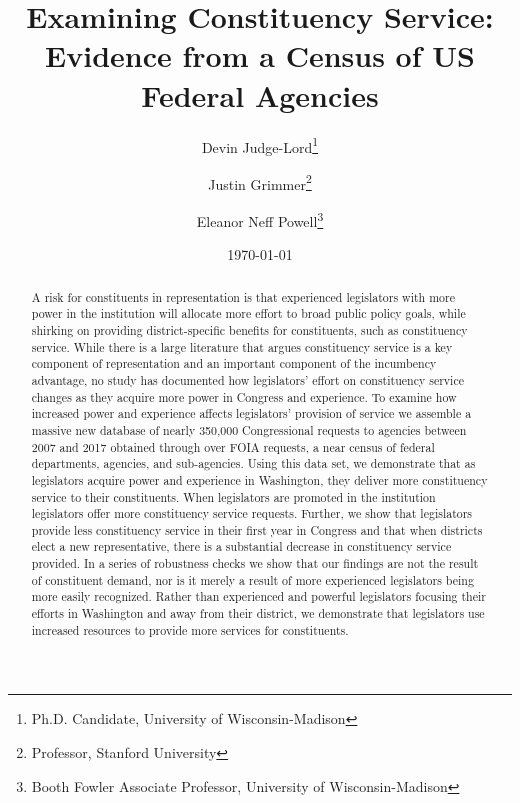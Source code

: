 \documentclass{article}
\title{Examining Constituency Service: Evidence from a Census of US Federal Agencies}
\author{Devin Judge-Lord\thanks{Ph.D. Candidate, University of Wisconsin-Madison}\and Justin Grimmer\thanks{Professor, Stanford University} \and Eleanor Neff Powell\thanks{Booth Fowler Associate Professor, University of Wisconsin-Madison}}
\date{\today}
\begin{document}
\maketitle




\begin{abstract}
\noindent A risk for constituents in representation is that experienced legislators with more power in the institution will allocate more effort to broad public policy goals, while shirking on providing district-specific benefits for constituents, such as constituency service.  While there is a large literature that argues constituency service is a key component of representation and an important component of the incumbency advantage, no study has documented how legislators' effort on constituency service changes as they acquire more power in Congress and experience.  To examine how increased power and experience affects legislators' provision of service we assemble a massive new database of nearly 350,000 Congressional requests to agencies between 2007 and 2017 obtained through over  FOIA requests, a near census of federal departments, agencies, and sub-agencies. Using this data set, we demonstrate that as legislators acquire power and experience in Washington, they deliver more constituency service to their constituents.  When legislators are promoted in the institution legislators offer more constituency service requests.  Further, we show that legislators provide less constituency service in their first year in Congress and that when districts elect a new representative, there is a substantial decrease in constituency service provided.  In a series of robustness checks we show that our findings are not the result of constituent demand, nor is it merely a result of more experienced legislators being more easily recognized.  Rather than experienced and powerful legislators focusing their efforts in Washington and away from their district, we demonstrate that legislators use increased resources to provide more services for constituents.  
\end{abstract}



%
\end{document}
